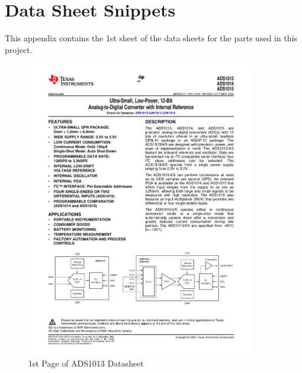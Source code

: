 \documentclass{article}
\numberwithin{figure}{section}
\numberwithin{equation}{section}
\begin{document}
{\section{Data Sheet Snippets} \label{sect:appendixE}
This appendix contains the 1st sheet of the data sheets for the parts used in this project.
\begin{figure}[H]
	\centering
	\includegraphics[page=1,width=0.9\textwidth]{combined.pdf}
	\caption{1st Page of ADS1013 Datasheet}
	\label{fig:adsdat}
\end{figure}
\newpage
\begin{figure}[H]
	\centering

\end{figure}}
\end{document}
